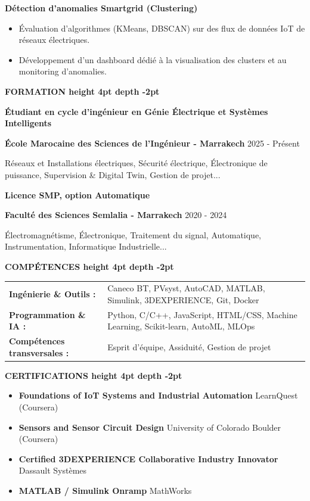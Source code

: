 \documentclass[10pt,a4paper]{altacv}
\renewcommand{\cvsection}[2][]{%
  \vspace{3pt}%
  {\color{heading}\LARGE\bfseries #2 \hspace{0.2em}\leaders\vrule height 4pt depth -2pt\hfill\mbox{}}\par\vspace{2pt}
}
\renewcommand{\cvevent}[4]{%
  {\large\bfseries\color{accent}#1\par}
  \vspace{1pt}\normalsize
  \ifstrequal{#2}{}{}{%
    \textbf{\color{emphasis}#2\ifstrequal{#4}{}{}{ - #4}}%
  }%
  \hfill
  \ifstrequal{#3}{}{}{{\small#3}}%
  \par\vspace{1pt}
}
\begin{document}
{\large\bfseries\color{accent} Détection d'anomalies Smartgrid (Clustering)}\\[0.05cm]
\begin{itemize}
  \item Évaluation d'algorithmes (KMeans, DBSCAN) sur des flux de données IoT de réseaux électriques.
  \item Développement d'un dashboard dédié à la visualisation des clusters et au monitoring d'anomalies.
\end{itemize}

\cvsection{FORMATION}
\cvevent{Étudiant en cycle d'ingénieur en Génie Électrique et Systèmes Intelligents}{École Marocaine des Sciences de l'Ingénieur}{2025 - Présent}{Marrakech}
\small Réseaux et Installations électriques, Sécurité électrique, Électronique de puissance, Supervision \& Digital Twin, Gestion de projet...

\cvevent{Licence SMP, option Automatique}{Faculté des Sciences Semlalia}{2020 - 2024}{Marrakech}
\small Électromagnétisme, Électronique, Traitement du signal, Automatique, Instrumentation, Informatique Industrielle...

\cvsection{COMPÉTENCES}
\begin{tabular}{@{}ll@{}}
\textbf{Ingénierie \& Outils :} & Caneco BT, PVsyst, AutoCAD, MATLAB, Simulink, 3DEXPERIENCE, Git, Docker \\[2pt]
\textbf{Programmation \& IA :} & Python, C/C++, JavaScript, HTML/CSS, Machine Learning, Scikit-learn, AutoML, MLOps \\[2pt]
\textbf{Compétences transversales :} & Esprit d'équipe, Assiduité, Gestion de projet \\
\end{tabular}

\cvsection{CERTIFICATIONS}
\begin{itemize}[leftmargin=*, label=\textbullet, itemsep=2pt]
  \item \textbf{Foundations of IoT Systems and Industrial Automation} \hfill {\color{emphasis}LearnQuest (Coursera)}
  \item \textbf{Sensors and Sensor Circuit Design} \hfill {\color{emphasis}University of Colorado Boulder (Coursera)}
  \item \textbf{Certified 3DEXPERIENCE Collaborative Industry Innovator} \hfill {\color{emphasis}Dassault Systèmes}
  \item \textbf{MATLAB / Simulink Onramp} \hfill {\color{emphasis}MathWorks}
\end{itemize}
\end{document}
